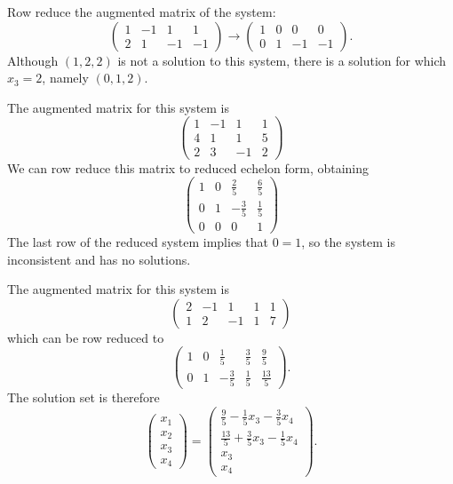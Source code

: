\soln Row reduce the augmented matrix of the system:
\[
\left(\begin{array}{rrr|r} 1 & -1 & 1 & 1 \\ 2 & 1 & -1 & -1\end{array}\right)
\longrightarrow
\left(\begin{array}{rrr|r} 1 & 0 & 0 & 0 \\ 0 & 1 & -1 & -1\end{array}\right).
\]
Although $(1,2,2)$ is not a solution to this system, there is a solution
for which $x_3 = 2$, namely $(0,1,2)$.

 The augmented matrix for this system is
\[
\left(\begin{array}{rrr|r} 1 & -1 & 1 & 1 \\ 4 & 1 & 1 & 5 \\
2 & 3 & -1 & 2\end{array}\right)
\]
We can row reduce this matrix to reduced echelon form, obtaining
\[
\left(\begin{array}{rrr|r} 1 & 0 & \frac{2}{5} & \frac{6}{5} \\
0 & 1 & -\frac{3}{5} & \frac{1}{5} \\ 0 & 0 & 0 & 1\end{array}\right)
\]
The last row of the reduced system implies that $0 = 1$, so the system
is inconsistent and has no solutions.

 The augmented matrix for this system is
\[
\left(\begin{array}{rrrr|r} 2 & -1 & 1 & 1 & 1 \\ 1 & 2 & -1 & 1 & 7
\end{array}\right)
\]
which can be row reduced to
\[
\left(\begin{array}{rrrr|r} 1 & 0 & \frac{1}{5} & \frac{3}{5} &
\frac{9}{5} \\ 0 & 1 & -\frac{3}{5} & \frac{1}{5} & \frac{13}{5}
\end{array}\right).
\]
The solution set is therefore
\[
\left(\begin{array}{c} x_1 \\ x_2 \\ x_3 \\ x_4\end{array}\right) =
\left(\begin{array}{c} \frac{9}{5} - \frac{1}{5}x_3 - \frac{3}{5}x_4
\\ \frac{13}{5} + \frac{3}{5}x_3 - \frac{1}{5}x_4 \\ x_3 \\ x_4
\end{array}\right).
\]

